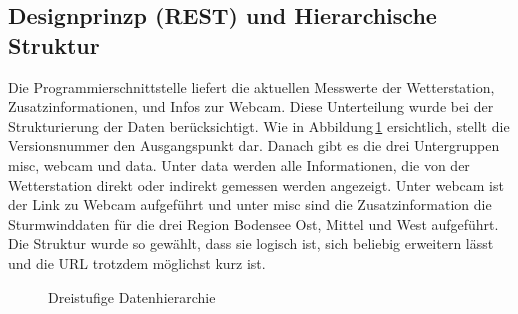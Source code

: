 \subsection{Designprinzp (REST) und Hierarchische Struktur}
Die Programmierschnittstelle liefert die aktuellen Messwerte der Wetterstation, Zusatzinformationen, und Infos zur Webcam. Diese Unterteilung wurde bei der Strukturierung der Daten berücksichtigt.
Wie in Abbildung\,\ref{img:hierarchie} ersichtlich, stellt die Versionsnummer den Ausgangspunkt dar. Danach gibt es die drei Untergruppen misc, webcam und data. Unter data werden alle Informationen, die von der Wetterstation direkt oder indirekt gemessen werden angezeigt. Unter webcam ist der Link zu Webcam aufgeführt und unter misc sind die Zusatzinformation die Sturmwinddaten für die drei Region Bodensee Ost, Mittel und West aufgeführt. Die Struktur wurde so gewählt, dass sie logisch ist, sich beliebig erweitern lässt und die URL trotzdem möglichst kurz ist.

\begin{figure}[htbp!]
	\centering
	\caption{Dreistufige Datenhierarchie}
	\label{img:hierarchie}
\end{figure}







